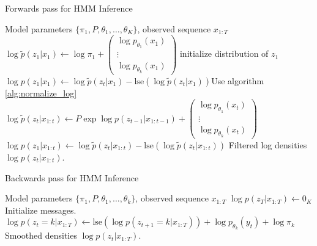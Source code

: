 \documentclass[14pt]{extreport}
\begin{document}
\begin{algorithm}
   \caption{Forwards pass for HMM Inference}
   \label{alg:hmm_forwards}
\begin{algorithmic}
   Model parameters $\{\pi_{1}, P, \theta_1, \dots, \theta_K\}$,
  observed sequence $x_{1:T}$
  \STATE $\log \tilde{p}\left(z_{1}\vert x_{1}\right) \leftarrow
  \log\pi_{1} + \begin{pmatrix} \log p_{\theta_{1}}\left(x_{1}\right) \\ \vdots \\ \log p_{\theta_{k}}\left(x_{1}\right) \end{pmatrix}$ \hfill initialize distribution of $z_{1}$
  \STATE $\log p\left(z_{1} \vert x_{1}\right) \leftarrow \log \tilde{p}\left(z_{t} \vert x_{1}\right) - \text{lse}\left(\log \tilde{p}\left(z_{t} \vert x_{1}\right)\right)$\hfill Use algorithm \ref{alg:normalize_log}
  \STATE $\log \tilde{p}\left(z_{t} \vert x_{1:t}\right) \leftarrow P \exp{\log p\left(z_{t - 1} \vert x_{1:t - 1}\right)} + \begin{pmatrix}  \log p_{\theta_{1}}\left(x_{t}\right) \\ \vdots \\ \log p_{\theta_{k}}\left(x_{t}\right) \end{pmatrix}$
  \STATE $\log p\left(z_{1} \vert x_{1:t}\right) \leftarrow \log \tilde{p}\left(z_{t} \vert x_{1:t}\right) - \text{lse}\left(\log \tilde{p}\left(z_{t} \vert x_{1:t}\right)\right)$\hfill
  \ENDFOR
   Filtered log densities $\log p\left(z_{t} \vert x_{1:t}\right)$.
\end{algorithmic}
\end{algorithm}

\begin{algorithm}
  \begin{algorithmic}
   \caption{Backwards pass for HMM Inference}
   \label{alg:hmm_backwards}
    Model parameters $\{\pi_{1}, P, \theta_1, \dots, \theta_k\}$, observed sequence $x_{1:T}$
   \STATE $\log p\left(z_{T} \vert x_{1:T}\right) \leftarrow 0_{K}$ \hfill Initialize messages.
   \STATE $\log p\left(z_{t} = k \vert x_{1:T}\right) \leftarrow \text{lse}\left(\log p\left(z_{t + 1} = k \vert x_{1:T}\right)\right) + \log p_{\theta_{k}}\left(y_{t}\right) + \log \pi_{k}$
   \ENDFOR
   \ENDFOR
    Smoothed densities $\log p\left(z_{t} \vert x_{1:T}\right)$.
  \end{algorithmic}
\end{algorithm}
\end{document}

